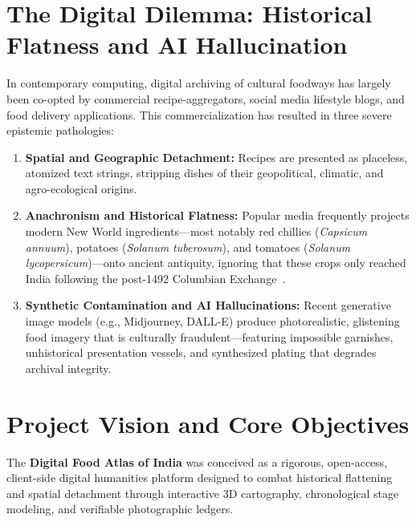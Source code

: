 \documentclass[11pt,a4paper]{report}
\begin{document}
\section{The Digital Dilemma: Historical Flatness and AI Hallucination}
In contemporary computing, digital archiving of cultural foodways has largely been co-opted by commercial recipe-aggregators, social media lifestyle blogs, and food delivery applications. This commercialization has resulted in three severe epistemic pathologies:
\begin{enumerate}
    \item \textbf{Spatial and Geographic Detachment:} Recipes are presented as placeless, atomized text strings, stripping dishes of their geopolitical, climatic, and agro-ecological origins.
    \item \textbf{Anachronism and Historical Flatness:} Popular media frequently projects modern New World ingredients---most notably red chillies (\emph{Capsicum annuum}), potatoes (\emph{Solanum tuberosum}), and tomatoes (\emph{Solanum lycopersicum})---onto ancient antiquity, ignoring that these crops only reached India following the post-1492 Columbian Exchange~\cite{crosby1972columbian}.
    \item \textbf{Synthetic Contamination and AI Hallucinations:} Recent generative image models (e.g., Midjourney, DALL-E) produce photorealistic, glistening food imagery that is culturally fraudulent---featuring impossible garnishes, unhistorical presentation vessels, and synthesized plating that degrades archival integrity.
\end{enumerate}

\section{Project Vision and Core Objectives}
The \textbf{Digital Food Atlas of India} was conceived as a rigorous, open-access, client-side digital humanities platform designed to combat historical flattening and spatial detachment through interactive 3D cartography, chronological stage modeling, and verifiable photographic ledgers.
\end{document}
